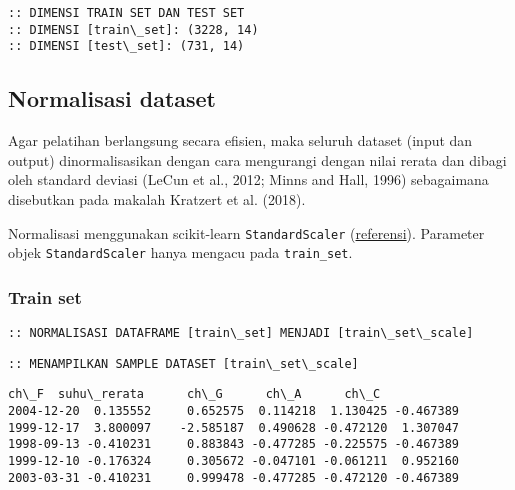 \documentclass[11pt]{article}
\makeatletter
\newcommand{\boxspacing}{\kern\kvtcb@left@rule\kern\kvtcb@boxsep}
\newcommand{\prompt}[4]{
        \ttfamily\llap{{\color{#2}[#3]:\hspace{3pt}#4}}\vspace{-\baselineskip}
    }
\makeatother
\begin{document}
    \begin{Verbatim}[commandchars=\\\{\}]
:: DIMENSI TRAIN SET DAN TEST SET
:: DIMENSI [train\_set]: (3228, 14)
:: DIMENSI [test\_set]: (731, 14)
    \end{Verbatim}

    \hypertarget{normalisasi-dataset}{%
\subsection{Normalisasi dataset}\label{normalisasi-dataset}}

Agar pelatihan berlangsung secara efisien, maka seluruh dataset (input
dan output) dinormalisasikan dengan cara mengurangi dengan nilai rerata
dan dibagi oleh standard deviasi (LeCun et al., 2012; Minns and Hall,
1996) sebagaimana disebutkan pada makalah Kratzert et al. (2018).

Normalisasi menggunakan scikit-learn \texttt{StandardScaler}
(\href{https://scikit-learn.org/stable/modules/generated/sklearn.preprocessing.StandardScaler.html}{referensi}).
Parameter objek \texttt{StandardScaler} hanya mengacu pada
\texttt{train\_set}.

    \hypertarget{train-set}{%
\subsubsection{Train set}\label{train-set}}

    \begin{Verbatim}[commandchars=\\\{\}]
:: NORMALISASI DATAFRAME [train\_set] MENJADI [train\_set\_scale]
    \end{Verbatim}

    \begin{Verbatim}[commandchars=\\\{\}]
:: MENAMPILKAN SAMPLE DATASET [train\_set\_scale]
    \end{Verbatim}

            \begin{tcolorbox}[breakable, size=fbox, boxrule=.5pt, pad at break*=1mm, opacityfill=0]
\prompt{Out}{outcolor}{0}{\boxspacing}
\begin{Verbatim}[commandchars=\\\{\}]
                ch\_F  suhu\_rerata      ch\_G      ch\_A      ch\_C
2004-12-20  0.135552     0.652575  0.114218  1.130425 -0.467389
1999-12-17  3.800097    -2.585187  0.490628 -0.472120  1.307047
1998-09-13 -0.410231     0.883843 -0.477285 -0.225575 -0.467389
1999-12-10 -0.176324     0.305672 -0.047101 -0.061211  0.952160
2003-03-31 -0.410231     0.999478 -0.477285 -0.472120 -0.467389
\end{Verbatim}
\end{tcolorbox}
        
\end{document}
